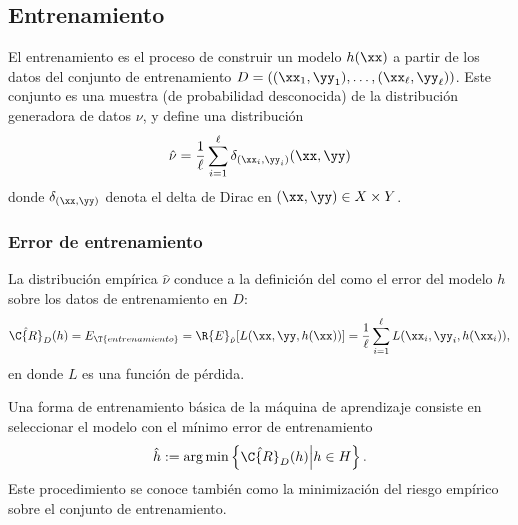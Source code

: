 %
%
\subsection{Entrenamiento}
%
El entrenamiento es el proceso de construir un modelo $h(\xx)$ a
partir de los datos del conjunto de entrenamiento
$D=\left((\xx_1,\yy_1),\ldots,(\xx_\ell,\yy_\ell)\right)$.
Este conjunto es una muestra (de probabilidad desconocida) de la
distribución generadora de datos $\nu$, y define una distribución
%
\begin{align}
  \hat{\nu}=\frac{1}{\ell}\sum_{i=1}^{\ell}\delta_{(\xx_i,\yy_i)}(\xx,\yy)
\end{align}
%
donde $\delta_{(\xx,\yy)}$ denota el delta de Dirac en
$(\xx,\yy)\in{}X\times{}Y$.
%
\subsubsection{Error de entrenamiento}
%
La distribución empírica $\hat{\nu}$ conduce a la definición del
 como el error del modelo $h$ sobre los
datos de entrenamiento en $D$:
%
\begin{align}
  \hat{\C{R}}_D(h)=E_\T{entrenamiento}=\R{E}_{\hat{\nu}}[L(\xx,\yy,h(\xx))]
  =\frac{1}{\ell}\sum_{i=1}^\ell L(\xx_i, \yy_i, h(\xx_i)),
\end{align}
%
en donde $L$ es una función de pérdida.
%

%
Una forma de entrenamiento básica de la máquina de aprendizaje consiste en
seleccionar el modelo con el mínimo error de entrenamiento
%
\begin{align}
  \hat{h}:=\arg \min \left\{ \hat{\C{R}}_D(h)\middle|h \in H\right\}.
\end{align}
%
Este procedimiento se conoce también como la minimización del riesgo
empírico sobre el conjunto de entrenamiento.
